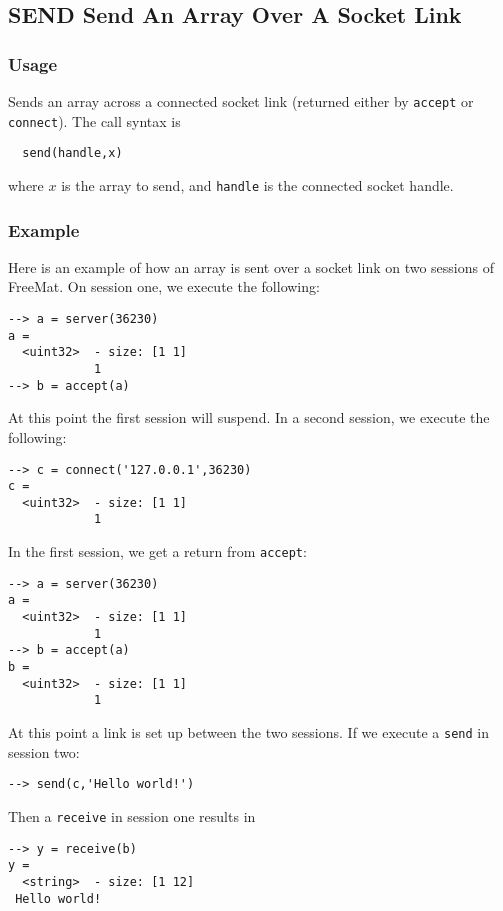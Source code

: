 %
%
%
\subsection{SEND Send An Array Over A Socket Link}
\subsubsection{Usage}
Sends an array across a connected socket link (returned
either by \verb|accept| or \verb|connect|).  The call syntax is
\begin{verbatim}
  send(handle,x)
\end{verbatim}
where $x$ is the array to send, and \verb|handle| is the 
connected socket handle.
\subsubsection{Example}
Here is an example of how an array is sent over a socket link on two sessions of FreeMat.  On session one, we execute the following:
\begin{verbatim}
--> a = server(36230)
a =
  <uint32>  - size: [1 1]
            1
--> b = accept(a)
\end{verbatim}
At this point the first session will suspend.  In a second session, we execute the following:
\begin{verbatim}
--> c = connect('127.0.0.1',36230)
c =
  <uint32>  - size: [1 1]
            1
\end{verbatim}
In the first session, we get a return from \verb|accept|:
\begin{verbatim}
--> a = server(36230)
a =
  <uint32>  - size: [1 1]
            1
--> b = accept(a)
b =
  <uint32>  - size: [1 1]
            1
\end{verbatim}
At this point a link is set up between the two sessions.  If we execute a \verb|send| in session two:
\begin{verbatim}
--> send(c,'Hello world!')
\end{verbatim}
Then a \verb|receive| in session one results in
\begin{verbatim}
--> y = receive(b)
y =
  <string>  - size: [1 12]
 Hello world!
\end{verbatim}
